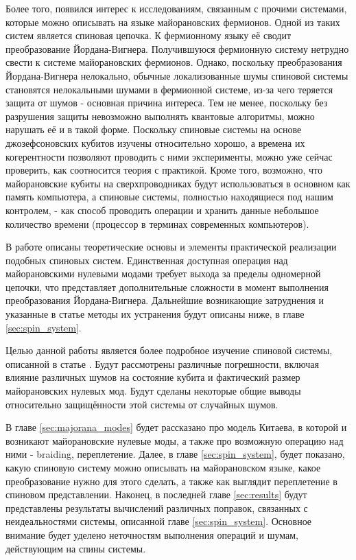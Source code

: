 \documentclass[a4paper,12pt]{article}
\theoremstyle{plain} %
\theoremstyle{definition} %
\theoremstyle{remark} %
\begin{document}
Более того, появился интерес к исследованиям, связанным с прочими системами, которые можно описывать на языке майорановских фермионов. Одной из таких систем является спиновая цепочка. К фермионному языку её сводит преобразование Йордана-Вигнера. Получившуюся фермионную систему нетрудно свести к системе майорановских фермионов. Однако, поскольку преобразования Йордана-Вигнера нелокально, обычные локализованные шумы спиновой системы становятся нелокальными шумами в фермионной системе, из-за чего теряется защита от шумов - основная причина интереса. Тем не менее, поскольку без разрушения защиты невозможно выполнять квантовые алгоритмы, можно нарушать её и в такой форме. Поскольку спиновые системы на основе джозефсоновских кубитов изучены относительно хорошо, а времена их когерентности позволяют проводить с ними эксперименты, можно уже сейчас проверить, как соотносится теория с практикой. Кроме того, возможно, что майорановские кубиты на сверхпроводниках будут использоваться в основном как память компьютера, а спиновые системы, полностью находящиеся под нашим контролем, - как способ проводить операции и хранить данные небольшое количество времени (процессор в терминах современных компьютеров).

В работе \cite{main} описаны теоретические основы и элементы практической реализации подобных спиновых систем. Единственная доступная операция над майорановскими нулевыми модами требует выхода за пределы одномерной цепочки, что представляет дополнительные сложности в момент выполнения преобразования Йордана-Вигнера. Дальнейшие возникающие затруднения и указанные в статье методы их устранения будут описаны ниже, в главе \ref{sec:spin_system}.

Целью данной работы является более подробное изучение спиновой системы, описанной в статье \cite{main}. Будут рассмотрены различные погрешности, включая влияние различных шумов на состояние кубита и фактический размер майорановских нулевых мод. Будут сделаны некоторые общие выводы относительно защищённости этой системы от случайных шумов.

В главе \ref{sec:majorana_modes} будет рассказано про модель Китаева, в которой и возникают майорановские нулевые моды, а также про возможную операцию над ними - braiding, переплетение. Далее, в главе \ref{sec:spin_system}, будет показано, какую спиновую систему можно описывать на майорановском языке, какое преобразование нужно для этого сделать, а также как выглядит переплетение в спиновом представлении. Наконец, в последней главе \ref{sec:results} будут представлены результаты вычислений различных поправок, связанных с неидеальностями системы, описанной главе \ref{sec:spin_system}. Основное внимание будет уделено неточностям выполнения операций и шумам, действующим на спины системы.
\end{document}
